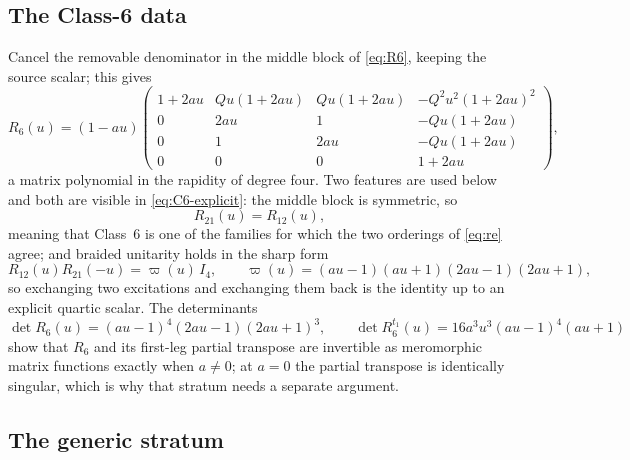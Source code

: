 \documentclass[11pt,reqno]{amsart}
\theoremstyle{plain}
\theoremstyle{definition}
\theoremstyle{remark}
\numberwithin{equation}{section}
\begin{document}
\subsection{The Class-6 data}

Cancel the removable denominator in the middle block of \cref{eq:R6}, keeping
the source scalar; this gives
\begin{equation}
R_6(u)=(1-au)
\begin{pmatrix}
1+2au&Qu(1+2au)&Qu(1+2au)&-Q^2u^2(1+2au)^2\\
0&2au&1&-Qu(1+2au)\\
0&1&2au&-Qu(1+2au)\\
0&0&0&1+2au
\end{pmatrix},
\label{eq:C6-explicit}
\end{equation}
a matrix polynomial in the rapidity of degree four. Two features are used below
and both are visible in \cref{eq:C6-explicit}: the middle block is symmetric, so
\begin{equation}
R_{21}(u)=R_{12}(u),
\label{eq:C6-PT}
\end{equation}
meaning that Class~6 is one of the families for which the two orderings of
\cref{eq:re} agree; and braided unitarity holds in the sharp form
\begin{equation}
R_{12}(u)R_{21}(-u)=\varpi(u)\,I_4,
\qquad
\varpi(u)=(au-1)(au+1)(2au-1)(2au+1),
\label{eq:C6-unitarity}
\end{equation}
so exchanging two excitations and exchanging them back is the identity up to an
explicit quartic scalar. The determinants
\begin{equation}
\det R_6(u)=(au-1)^4(2au-1)(2au+1)^3,\qquad
\det R_6^{t_1}(u)=16a^3u^3(au-1)^4(au+1)
\label{eq:C6-determinants}
\end{equation}
show that $R_6$ and its first-leg partial transpose are invertible as meromorphic
matrix functions exactly when $a\ne0$; at $a=0$ the partial transpose is
identically singular, which is why that stratum needs a separate argument.

\subsection{The generic stratum}
\end{document}
